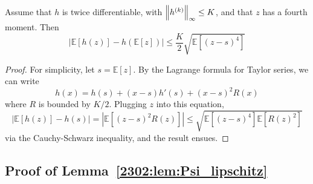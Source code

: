\begin{lemma}\label{2302:lem:average_twice_diff_function}
    Assume that $h$ is twice differentiable, with $\left\lVert h^{(k)}\right\rVert_\infty \leq K$, and that $z$ has a fourth moment. Then
    \begin{equation}
        \left|\mathbb{E}[h(z)] - h(\mathbb{E}[z])\right| \leq \frac K2 \sqrt{\mathbb{E}\left[(z-s)^4 \right]} 
    \end{equation}
\end{lemma}
\begin{proof}
    For simplicity, let $s = \mathbb{E}[z]$. By the Lagrange formula for Taylor series, we can write
    \begin{equation}
        h(x) = h(s) + (x-s)h'(s) + (x-s)^2 R(x)
    \end{equation}
    where $R$ is bounded by $K/2$. Plugging $z$ into this equation,
    \begin{equation}
        \left|\mathbb{E}[h(z)] - h(s)\right| = \left|\mathbb{E}\left[ (z-s)^2 R(z) \right] \right|
        \leq \sqrt{\mathbb{E}\left[(z-s)^4 \right] \mathbb{E}\left[ R(z)^2 \right]}
    \end{equation}
    via the Cauchy-Schwarz inequality, and the result ensues.
\end{proof}

\subsection{Proof of Lemma~\ref{2302:lem:Psi_lipschitz}}

